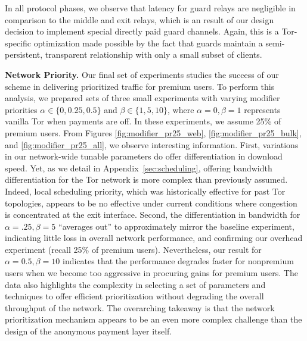 In all protocol phases, we observe that latency for guard relays are negligible
in comparison to the middle and exit relays, which is an result of our design
decision to implement special directly paid guard channels. Again, this is a
Tor-specific optimization made possible by the fact that guards maintain a
semi-persistent, transparent relationship with only a small subset of clients.


\medskip
\noindent
\textbf{Network Priority.}
\label{sec:priority_exp}
Our final set of experiments studies the success of our scheme in delivering
prioritized traffic for premium users. To perform this analysis, we prepared
sets of three small experiments with varying modifier priorities $\alpha \in
\{0, 0.25, 0.5\}$ and $\beta \in \{1, 5, 10\}$, where $\alpha = 0, \beta = 1$
represents vanilla Tor when payments are off. In these experiments, we assume
25\% of premium users. From Figures \ref{fig:modifier_pr25_web},
\ref{fig:modifier_pr25_bulk}, and \ref{fig:modifier_pr25_all}, we observe
interesting information. First, variations in our network-wide tunable
parameters do offer differentiation in download speed. Yet, as we detail in
Appendix~\ref{sec:scheduling}, offering bandwidth differentiation for the Tor
network is more complex than previously assumed. Indeed, local scheduling
priority, which was historically effective for past Tor topologies, appears to
be no effective under current conditions where congestion is concentrated at
the exit interface. Second, the differentiation in bandwidth for $\alpha = .25,
\beta=5$ ``averages out'' to approximately mirror the baseline experiment,
indicating little loss in overall network performance, and confirming our
overhead experiment (recall 25\% of premium users). Nevertheless, our result for
$\alpha = 0.5, \beta=10$ indicates that the performance degrades faster for
nonpremium users when we become too aggressive in procuring gains for
premium users. The data also highlights the complexity in selecting a set of
parameters and techniques to offer efficient prioritization without degrading
the overall throughput of the network. The overarching takeaway is that the
network prioritization mechanism appears to be an even more complex challenge
than the design of the anonymous payment layer itself.


